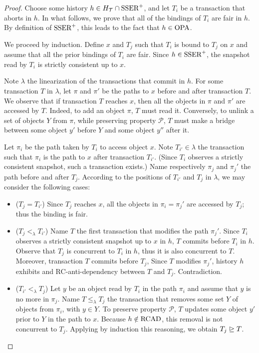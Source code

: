 \begin{proof}
  Choose some history $h \in H_{\mathcal{T}} \inter \SPSER$, and let $T_i$ be a transaction that aborts in $h$.
  In what follows, we prove that all of the bindings of $T_i$ are fair in $h$.
  By definition of $\SPSER$, this leads to the fact that $h \in \OPA$.

  We proceed by induction.
  Define $x$ and $T_j$ such that $T_i$ is bound to $T_j$ on $x$ and assume that all the prior bindings of $T_i$ are fair.
  Since $h \in \SPSER$, the snapshot read by $T_i$ is strictly consistent up to $x$.

  Note $\lambda$ the linearization of the transactions that commit in $h$.
  For some transaction $T$ in $\lambda$, let $\pi$ and $\pi'$ be the paths to $x$ before and after transaction $T$.
  We observe that if transaction $T$ reaches $x$, then all the objects in $\pi$ and $\pi'$ are accessed by $T$.
  Indeed, to add an object $\pi$, $T$ must read it.
  Conversely, to unlink a set of objects $Y$ from $\pi$, while preserving property $\mathcal{P}$, $T$ must make a bridge between some object $y'$ before $Y$ and some object $y''$ after it.

  Let $\pi_i$ be the path taken by $T_i$ to access object $x$.
  Note $T_{i'} \in \lambda$ the transaction such that $\pi_i$ is the path to $x$ after transaction $T_{i'}$.
  (Since $T_i$ observes a strictly consistent snapshot, such a transaction exists.)
  Name respectively $\pi_j$ and ${\pi_j}'$ the path before and after $T_j$.  
  According to the positions of $T_{i'}$ and $T_{j}$ in $\lambda$, we may consider the following cases:
  \begin{itemize}
  \item ($T_j = T_{i'}$)
    Since $T_j$ reaches $x$, all the objects in $\pi_i = {\pi_j}'$ are accessed by $T_j$; thus the binding is fair.
  \item ($T_{j} <_{\lambda} T_{i'}$)
    Name $T$ the first transaction that modifies the path ${\pi_j}'$.
    Since $T_i$ observes a strictly consistent snapshot up to $x$ in $h$, $T$ commits before $T_i$ in $h$.
    Observe that $T_j$ is concurrent to $T_i$ in $h$, thus it is also concurrent to $T$.
    Moreover, transaction $T$ commits before $T_j$,
    Since $T$ modifies ${\pi_j}'$, history $h$ exhibits and RC-anti-dependency between $T$ and $T_j$.
    Contradiction.
  \item ($T_{i'} <_{\lambda} T_j$)
    Let $y$ be an object read by $T_i$ in the path $\pi_i$ and assume that $y$ is no more in $\pi_j$.
    Name $T \leq_{\lambda} T_{j}$ the transaction that removes some set $Y$ of objects from $\pi_i$, with $y \in Y$.
    To preserve property $\mathcal{P}$, $T$ updates some object $y'$ prior to $Y$ in the path to $x$.
    Because $h \notin \RCAD$, this removal is not concurrent to $T_j$.
    Applying by induction this reasoning, we obtain $T_j \mathrel{\unrhd} T$.
  \end{itemize}
\end{proof}

